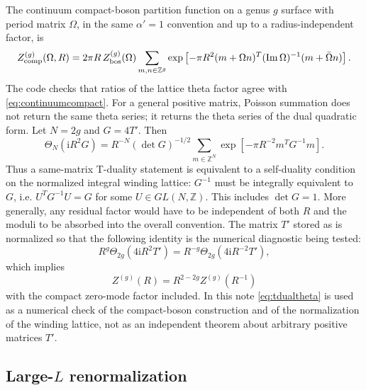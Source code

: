 \documentclass[11pt]{article}
\numberwithin{equation}{section}
\newcommand{\A}{\alpha'}
\newcommand{\bZ}{\mathbb Z}
\newcommand{\ii}{\mathrm i}
\newcommand{\im}{\operatorname{Im}}
\begin{document}
The continuum compact-boson partition function on a genus \(g\) surface with
period matrix \(\Omega\), in the same \(\A=1\) convention and up to a
radius-independent factor, is
\begin{equation}
        Z_{\rm comp}^{(g)}(\Omega,R)
        =
        2\pi R\, Z_{\rm bos}^{(g)}(\Omega)
        \sum_{m,n\in\bZ^g}
        \exp\left[
        -\pi R^2
        (m+\Omega n)^T(\im\Omega)^{-1}(m+\bar\Omega n)
        \right].
        \label{eq:continuumcompact}
\end{equation}
The code checks that ratios of the lattice theta factor agree with
\eqref{eq:continuumcompact}.  For a general positive matrix, Poisson summation
does not return the same theta series; it returns the theta series of the dual
quadratic form.  Let \(N=2g\) and \(G=4T'\).  Then
\begin{equation}
        \Theta_N(\ii R^2G)
        =
        R^{-N}(\det G)^{-1/2}
        \sum_{m\in\bZ^N}
        \exp\left[-\pi R^{-2}m^TG^{-1}m\right].
        \label{eq:poissontheta}
\end{equation}
Thus a same-matrix T-duality statement is equivalent to a self-duality
condition on the normalized integral winding lattice: \(G^{-1}\) must be
integrally equivalent to \(G\), i.e. \(U^TG^{-1}U=G\) for some
\(U\in GL(N,\bZ)\).  This includes \(\det G=1\).  More generally, any residual
factor would have to be independent of both \(R\) and the moduli to be
absorbed into the overall convention.  The matrix \(T'\) stored as
 is normalized so that the following identity is the numerical
diagnostic being tested:
\begin{equation}
        R^g\Theta_{2g}(4\ii R^2T')
        =
        R^{-g}\Theta_{2g}(4\ii R^{-2}T'),
        \label{eq:tdualtheta}
\end{equation}
which implies
\begin{equation}
        Z^{(g)}(R)=R^{2-2g}Z^{(g)}(R^{-1})
\end{equation}
with the compact zero-mode factor included.  In this note \eqref{eq:tdualtheta}
is used as a numerical check of the compact-boson construction and of the
normalization of the winding lattice, not as an independent theorem about
arbitrary positive matrices \(T'\).

\subsection{\texorpdfstring{Large-\(L\) renormalization}{Large-L renormalization}}
\end{document}
